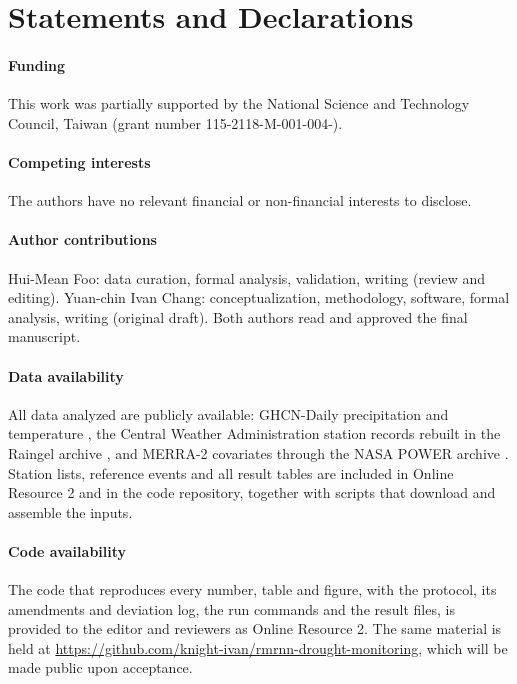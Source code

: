 \documentclass[pdflatex,sn-mathphys-ay]{sn-jnl}
\theoremstyle{thmstyletwo}
\begin{document}


\section*{Statements and Declarations}
\paragraph{Funding} This work was partially supported by the National Science and Technology Council,
Taiwan (grant number 115-2118-M-001-004-).

\paragraph{Competing interests} The authors have no relevant financial or non-financial interests to
disclose.

\paragraph{Author contributions} Hui-Mean Foo: data curation, formal analysis, validation, writing
(review and editing). Yuan-chin Ivan Chang: conceptualization, methodology, software, formal analysis,
writing (original draft). Both authors read and approved the final manuscript.

\paragraph{Data availability} All data analyzed are publicly available: GHCN-Daily precipitation and
temperature \citep{ghcnd_data}, the Central Weather Administration station records rebuilt in the
Raingel archive \citep{raingel_data}, and MERRA-2 covariates through the NASA POWER archive
\citep{nasapower_data}. Station lists, reference events and all result tables are included in Online
Resource 2 and in the code repository, together with scripts that download and assemble the inputs.

\paragraph{Code availability} The code that reproduces every number, table and figure, with the
protocol, its amendments and deviation log, the run commands and the result files, is provided to the
editor and reviewers as Online Resource 2. The same material is held at
\url{https://github.com/knight-ivan/rmrnn-drought-monitoring}, which will be made public upon
acceptance.
\end{document}
